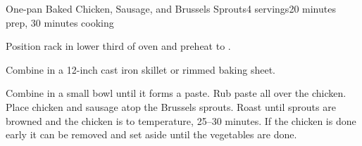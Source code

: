 \documentclass[../Cookbook.tex]{subfiles}
\begin{document}
\begin{recipe}{One-pan Baked Chicken, Sausage, and Brussels Sprouts}{4 servings}{20 minutes prep, 30 minutes cooking}

Position rack in lower third of oven and preheat to .

Combine in a 12-inch cast iron skillet or rimmed baking sheet.

Combine in a small bowl until it forms a paste. Rub paste all over the chicken. Place chicken and sausage atop the Brussels sprouts. Roast until sprouts are browned and the chicken is to temperature, 25--30 minutes. If the chicken is done early it can be removed and set aside until the vegetables are done.


\end{recipe}
\end{document}

